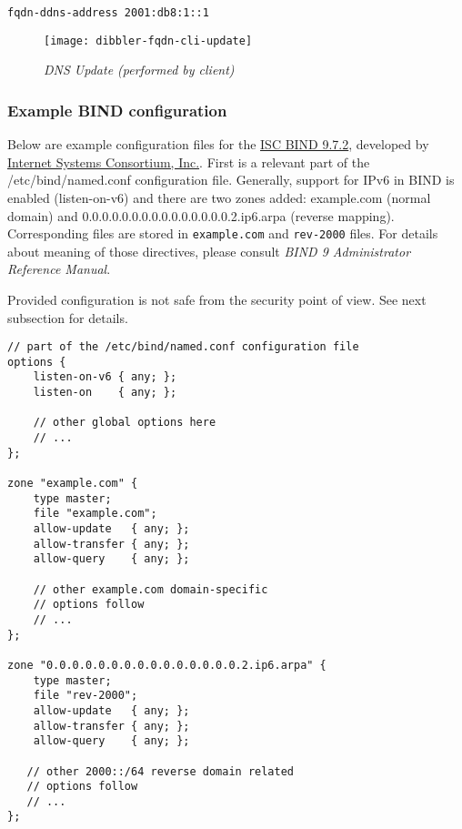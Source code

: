 \begin{lstlisting}
fqdn-ddns-address 2001:db8:1::1
\end{lstlisting}

\begin{figure}[ht]
\begin{center}
\texttt{[image: dibbler-fqdn-cli-update]}
\caption{\emph{DNS Update (performed by client)}}
\end{center}
\end{figure}

\subsubsection{Example BIND configuration}
Below are example configuration files for
the \href{http://www.isc.org/software/bind}{ISC BIND 9.7.2}, developed
by \href{http://www.isc.org}{Internet Systems Consortium, Inc.}.
First is a
relevant part of the /etc/bind/named.conf configuration file. Generally,
support for IPv6 in BIND is enabled (listen-on-v6) and there are two
zones added: example.com (normal domain) and
0.0.0.0.0.0.0.0.0.0.0.0.0.0.0.2.ip6.arpa (reverse
mapping). Corresponding files are stored in \verb+example.com+ and
\verb+rev-2000+ files. For details about meaning of those directives,
please consult \emph{BIND 9 Administrator Reference Manual}.

\Note Provided configuration is not safe from the security point of
view. See next subsection for details.

\begin{lstlisting}
// part of the /etc/bind/named.conf configuration file
options {
    listen-on-v6 { any; };
    listen-on    { any; };

    // other global options here
    // ...
};

zone "example.com" {
    type master;
    file "example.com";
    allow-update   { any; };
    allow-transfer { any; };
    allow-query    { any; };

    // other example.com domain-specific
    // options follow
    // ...
};

zone "0.0.0.0.0.0.0.0.0.0.0.0.0.0.0.2.ip6.arpa" {
    type master;
    file "rev-2000";
    allow-update   { any; };
    allow-transfer { any; };
    allow-query    { any; };

   // other 2000::/64 reverse domain related
   // options follow
   // ...
};
\end{lstlisting}


